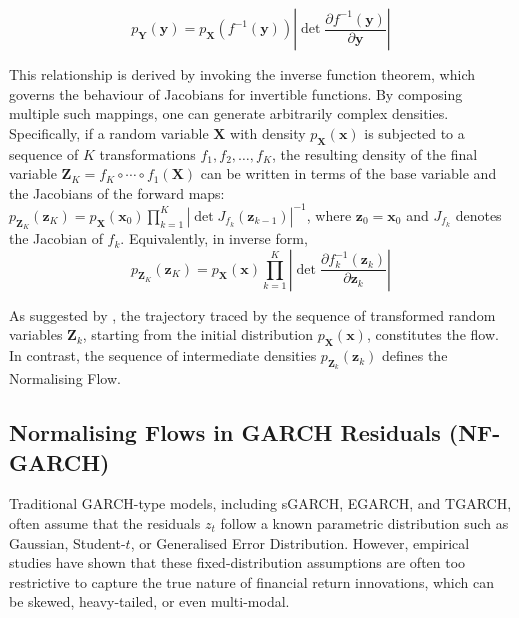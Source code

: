 \documentclass[oneside,12pt]{CUEDthesisPSnPDF}
\newcommand{\textcite}{\citet}
\begin{document}
\begin{equation}
p_\mathbf{Y}(\mathbf{y}) = p_\mathbf{X}\left(f^{-1}(\mathbf{y})\right) \left|\det \frac{\partial f^{-1}(\mathbf{y})}{\partial \mathbf{y}}\right|
\end{equation}

\vspace{15pt}

This relationship is derived by invoking the inverse function theorem, which governs the behaviour of Jacobians for invertible functions. By composing multiple such mappings, one can generate arbitrarily complex densities. Specifically, if a random variable \(\mathbf{X}\) with density \(p_\mathbf{X}(\mathbf{x})\) is subjected to a sequence of \(K\) transformations \(f_1, f_2, \dots, f_K\), the resulting density of the final variable \(\mathbf{Z}_K = f_K \circ \cdots \circ f_1(\mathbf{X})\) can be written in terms of the base variable and the Jacobians of the forward maps: \(p_{\mathbf{Z}_K}(\mathbf{z}_K) = p_\mathbf{X}(\mathbf{x}_0) \prod_{k=1}^{K} \left|\det J_{f_k}(\mathbf{z}_{k-1})\right|^{-1}\), where \(\mathbf{z}_0 = \mathbf{x}_0\) and \(J_{f_k}\) denotes the Jacobian of \(f_k\). Equivalently, in inverse form,\\

\begin{equation}
p_{\mathbf{Z}_K}(\mathbf{z}_K) = p_\mathbf{X}(\mathbf{x}) \prod_{k=1}^{K} \left|\det \frac{\partial f_k^{-1}(\mathbf{z}_k)}{\partial \mathbf{z}_k}\right|
\end{equation}

\vspace{15pt}

As suggested by \textcite{kobyzev2020normalising}, the trajectory traced by the sequence of transformed random variables \(\mathbf{Z}_k\), starting from the initial distribution \(p_\mathbf{X}(\mathbf{x})\), constitutes the flow. In contrast, the sequence of intermediate densities \(p_{\mathbf{Z}_k}(\mathbf{z}_k)\) defines the Normalising Flow.\\


\subsection{Normalising Flows in GARCH Residuals (NF-GARCH)}
\noindent 
Traditional GARCH-type models, including sGARCH, EGARCH, and TGARCH, often assume that the residuals \( z_t \) follow a known parametric distribution such as Gaussian, Student-\( t \), or Generalised Error Distribution. However, empirical studies have shown that these fixed-distribution assumptions are often too restrictive to capture the true nature of financial return innovations, which can be skewed, heavy-tailed, or even multi-modal.\\
\end{document}
